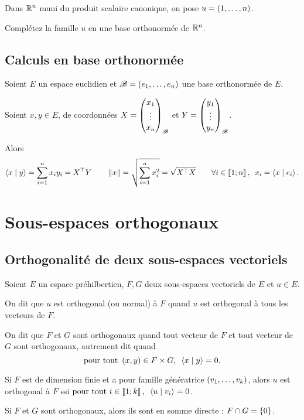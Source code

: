 \begin{exo}
Dans \(\mathbb{R}^n\) muni du produit scalaire canonique, on pose \(u=\left(1,\dots,n\right)\).

Complétez la famille \(u\) en une base orthonormée de \(\mathbb{R}^n\).
\end{exo}

\subsection{Calculs en base orthonormée}

Soient \(E\) un espace euclidien et \(\mathscr{B}=\left(e_1,\dots,e_n\right)\) une base orthonormée de \(E\).

Soient \(x,y\in E\), de coordonnées \(X=\begin{pmatrix}x_1\\\vdots\\x_n\end{pmatrix}_{\mathscr{B}}\) et \(Y=\begin{pmatrix}y_1\\\vdots\\y_n\end{pmatrix}_{\mathscr{B}}\).

Alors \[\ps{x}{y}=\sum_{i=1}^nx_iy_i=\trans{X}Y\qquad\norme{x}=\sqrt{\sum_{i=1}^nx_i^2}=\sqrt{\trans{X}X}\qquad\quantifs{\forall i\in\interventierii{1}{n}}x_i=\ps{x}{e_i}.\]

\section{Sous-espaces orthogonaux}

\subsection{Orthogonalité de deux sous-espaces vectoriels}

\begin{defi}
Soient \(E\) un espace préhilbertien, \(F,G\) deux sous-espaces vectoriels de \(E\) et \(u\in E\).

On dit que \(u\) est orthogonal (ou normal) à \(F\) quand \(u\) est orthogonal à tous les vecteurs de \(F\).

On dit que \(F\) et \(G\) sont orthogonaux quand tout vecteur de \(F\) et tout vecteur de \(G\) sont orthogonaux, autrement dit quand \[\quantifs{\tpt\paren{x,y}\in F\times G}\ps{x}{y}=0.\]
\end{defi}

\begin{prop}
Si \(F\) est de dimension finie et a pour famille génératrice \(\left(v_1,\dots,v_k\right)\), alors \(u\) est orthogonal à \(F\) ssi \(\quantifs{\tpt i\in\interventierii{1}{k}}\ps{u}{v_i}=0\).
\end{prop}

\begin{prop}
Si \(F\) et \(G\) sont orthogonaux, alors ils sont en somme directe : \(F\cap G=\left\lbrace0\right\rbrace\).
\end{prop}

